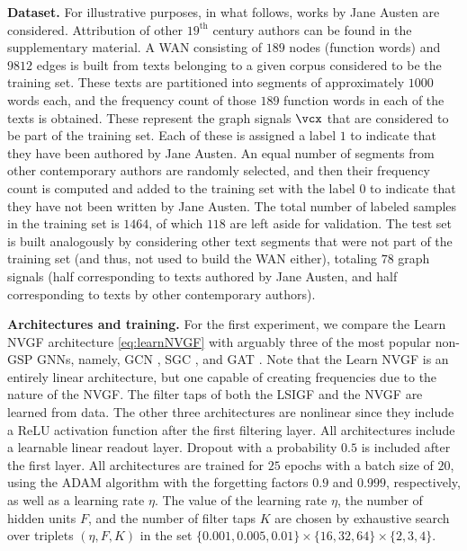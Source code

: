 \textbf{Dataset.} For illustrative purposes, in what follows, works by Jane Austen are considered.
Attribution of other $\text{19}^{\text{th}}$ century authors can be found in the supplementary material.
A WAN consisting of $189$ nodes (function words) and $9812$ edges is built from texts belonging to a given corpus considered to be the training set. These texts are partitioned into segments of approximately $1000$ words each, and the frequency count of those $189$ function words in each of the texts is obtained. These represent the graph signals $\vcx$ that are considered to be part of the training set. Each of these is assigned a label $1$ to indicate that they have been authored by Jane Austen. An equal number of segments from other contemporary authors are randomly selected, and then their frequency count is computed and added to the training set with the label $0$ to indicate that they have not been written by Jane Austen. The total number of labeled samples in the training set is $1464$, of which $118$ are left aside for validation. The test set is built analogously by considering other text segments that were not part of the training set (and thus, not used to build the WAN either), totaling $78$ graph signals (half corresponding to texts authored by Jane Austen, and half corresponding to texts by other contemporary authors).

\textbf{Architectures and training.} For the first experiment, we compare the Learn NVGF architecture \eqref{eq:learnNVGF} with arguably three of the most popular non-GSP GNNs, namely, GCN \cite{Kipf2017-GCN}, SGC \cite{Weinberger2019-SGC}, and GAT \cite{Velickovic2018-GAT}. Note that the Learn NVGF is an entirely linear architecture, but one capable of creating frequencies due to the nature of the NVGF. The filter taps of both the LSIGF and the NVGF are learned from data. The other three architectures are nonlinear since they include a ReLU activation function after the first filtering layer. All architectures include a learnable linear readout layer. Dropout with a probability $0.5$ is included after the first layer. All architectures are trained for $25$ epochs with a batch size of $20$, using the ADAM algorithm \cite{Kingma15-ADAM} with the forgetting factors $0.9$ and $0.999$, respectively, as well as a learning rate $\eta$. The value of the learning rate $\eta$, the number of hidden units $F$, and the number of filter taps $K$ are chosen by exhaustive search over triplets $(\eta, F, K)$ in the set $\{0.001, 0.005, 0.01\} \times \{16, 32, 64\} \times \{2, 3, 4\}$.


